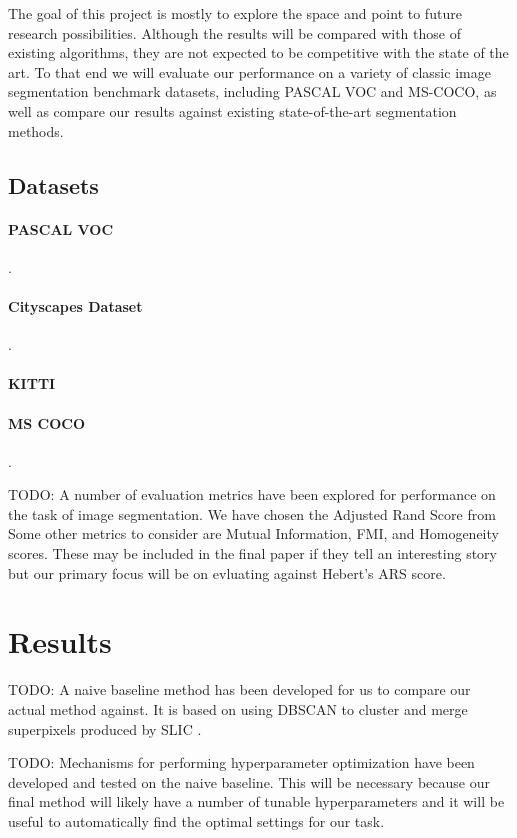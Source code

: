 \documentclass[twocolumn]{article}
\newcommand{\todo}[1]{}
\renewcommand{\todo}[1]{{\color{red} TODO: {#1}}}
\newcommand{\seclab}[1]{\label{sec:#1}}
\begin{document}
The goal of this project is mostly to explore the space and point to future research possibilities. Although the results will
be compared with those of existing algorithms, they are not expected to be competitive with the state of the art. To that end
we will evaluate our performance on a variety of classic image segmentation benchmark datasets, including PASCAL VOC and
MS-COCO, as well as compare our results against existing state-of-the-art segmentation methods. 

\subsection{Datasets}\seclab{data}

\paragraph{PASCAL VOC} \cite{Everingham10}.

\paragraph{Cityscapes Dataset} \cite{cordts2016cityscapes}.

\paragraph{KITTI} \cite{geiger2012we}

\paragraph{MS COCO} \cite{lin2014microsoft}.

\todo{
A number of evaluation metrics have been explored for performance on the task of image segmentation. We have chosen the
Adjusted Rand Score from \cite{unnikrishnan2005measure}  Some other metrics to consider are Mutual Information, FMI, and
Homogeneity scores. These may be included in the final paper if they tell an interesting story but our primary focus will be
on evluating against Hebert's ARS score.
}

\section{Results}\seclab{results}

\todo{
A naive baseline method has been developed for us to compare our actual method against. It is based on using DBSCAN
\cite{ester1996density} to cluster and merge superpixels produced by SLIC \cite{achanta2010slic}.
}

\todo{
Mechanisms for performing hyperparameter optimization have been developed and tested on the naive baseline. This will be
necessary because our final method will likely have a number of tunable hyperparameters and it will be useful to automatically
find the optimal settings for our task.
}


 
\end{document}
